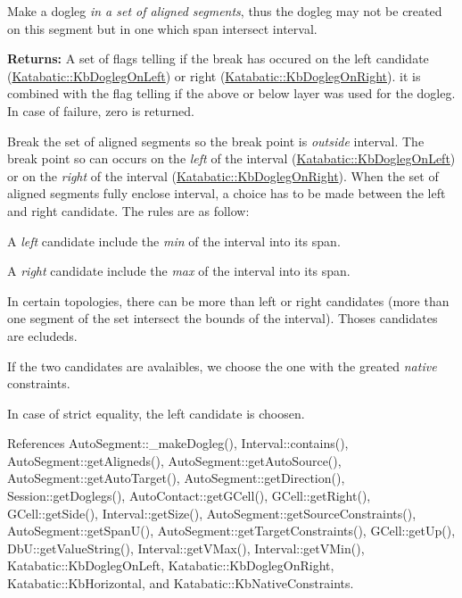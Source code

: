 Make a dogleg {\itshape in a set of aligned segments}, thus the dogleg may not be created on {\ttfamily this} segment but in one which span intersect {\ttfamily interval}.

{\bfseries Returns\+:} A set of flags telling if the break has occured on the left candidate (\mbox{\hyperlink{namespaceKatabatic_a2af2ad6b6441614038caf59d04b3b217a67bb7c53bbbc73a0e2d1f3f3e16ab679}{Katabatic\+::\+Kb\+Dogleg\+On\+Left}}) or right (\mbox{\hyperlink{namespaceKatabatic_a2af2ad6b6441614038caf59d04b3b217afe7fcb4c332f36e477433169b3d3f515}{Katabatic\+::\+Kb\+Dogleg\+On\+Right}}). it is combined with the flag telling if the above or below layer was used for the dogleg. In case of failure, zero is returned.

Break the set of aligned segments so the break point is {\itshape outside} {\ttfamily interval}. The break point so can occurs on the {\itshape left} of the interval (\mbox{\hyperlink{namespaceKatabatic_a2af2ad6b6441614038caf59d04b3b217a67bb7c53bbbc73a0e2d1f3f3e16ab679}{Katabatic\+::\+Kb\+Dogleg\+On\+Left}}) or on the {\itshape right} of the interval (\mbox{\hyperlink{namespaceKatabatic_a2af2ad6b6441614038caf59d04b3b217afe7fcb4c332f36e477433169b3d3f515}{Katabatic\+::\+Kb\+Dogleg\+On\+Right}}). When the set of aligned segments fully enclose {\ttfamily interval}, a choice has to be made between the left and right candidate. The rules are as follow\+:
\begin{DoxyItemize}
\item A {\itshape left} candidate include the {\itshape min} of the interval into it\textquotesingle{}s span.
\item A {\itshape right} candidate include the {\itshape max} of the interval into it\textquotesingle{}s span.
\item In certain topologies, there can be more than left or right candidates (more than one segment of the set intersect the bounds of the interval). Thoses candidates are ecludeds.
\item If the two candidates are avalaibles, we choose the one with the greated {\itshape native} constraints.
\item In case of strict equality, the left candidate is choosen.
\end{DoxyItemize}

 

References Auto\+Segment\+::\+\_\+make\+Dogleg(), Interval\+::contains(), Auto\+Segment\+::get\+Aligneds(), Auto\+Segment\+::get\+Auto\+Source(), Auto\+Segment\+::get\+Auto\+Target(), Auto\+Segment\+::get\+Direction(), Session\+::get\+Doglegs(), Auto\+Contact\+::get\+G\+Cell(), G\+Cell\+::get\+Right(), G\+Cell\+::get\+Side(), Interval\+::get\+Size(), Auto\+Segment\+::get\+Source\+Constraints(), Auto\+Segment\+::get\+Span\+U(), Auto\+Segment\+::get\+Target\+Constraints(), G\+Cell\+::get\+Up(), Db\+U\+::get\+Value\+String(), Interval\+::get\+V\+Max(), Interval\+::get\+V\+Min(), Katabatic\+::\+Kb\+Dogleg\+On\+Left, Katabatic\+::\+Kb\+Dogleg\+On\+Right, Katabatic\+::\+Kb\+Horizontal, and Katabatic\+::\+Kb\+Native\+Constraints.

